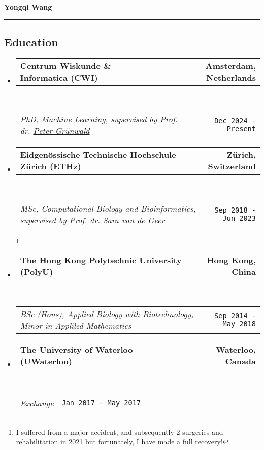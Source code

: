 \documentclass[10pt,a4paper]{article}
\makeatletter
\newcommand{\headerrow}[2]
{\begin{tabular*}{\linewidth}{l@{\extracolsep{\fill}}r}
	#1 &
	#2 \\
\end{tabular*}}
\newcommand{\urlPeter}{https://safestatistics.com/}
\newcommand{\urlSara}{https://stat.ethz.ch/~vsara/}
\makeatother
\begin{document}

\begin{center}
	{\LARGE \textbf{Yongqi Wang}}
\end{center}


\hrule
\vspace{-1em}
\subsection*{Education}

\begin{itemize}
	\parskip=0.1em

	\item
	      \headerrow
	      {\textbf{Centrum Wiskunde \& Informatica (CWI)}}
	      {\textbf{Amsterdam, Netherlands}}
	      \\
	      \headerrow
	      {\emph{PhD, Machine Learning, supervised by Prof. dr.
			      \href{\urlPeter}{Peter Grünwald}}}
	      {\texttt{Dec 2024 - Present}}

	\item
	      \headerrow
	      {\textbf{Eidgenössische Technische Hochschule Zürich (ETHz)}}
	      {\textbf{Zürich, Switzerland}}
	      \\
	      \headerrow
	      {\emph{MSc, Computational Biology and Bioinformatics,
			      supervised by Prof. dr. \href{\urlSara}{Sara van de Geer}}}
	      {\texttt{Sep 2018 - Jun 2023}}\footnote{
		      I suffered from a major accident, and
		      subsequently 2 surgeries and rehabilitation in 2021 but
		      fortunately, I have made a full recovery!
	      }

	\item
	      \headerrow
	      {\textbf{The Hong Kong Polytechnic University (PolyU)}}
	      {\textbf{Hong Kong, China}}
	      \\
	      \headerrow
	      {\emph{BSc (Hons), Applied Biology with Biotechnology,
			      Minor in Appliled Mathematics}}
	      {\texttt{Sep 2014 - May 2018}}

	\item
	      \headerrow
	      {\textbf{The University of Waterloo (UWaterloo)}}
	      {\textbf{Waterloo, Canada}}
	      \\
	      \headerrow
	      {\emph{Exchange}}
	      {\texttt{Jan 2017 - May 2017}}

\end{itemize}
\end{document}
